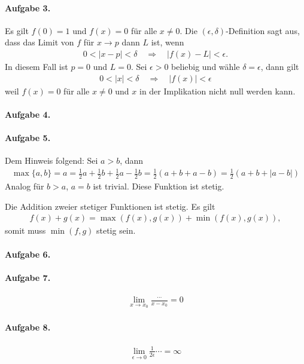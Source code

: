 \documentclass{article}
\begin{document}
\paragraph{Aufgabe 3.} Es gilt $f(0) = 1$ und $f(x) = 0$ für alle $x \neq 0$. Die $(\epsilon, \delta)$-Definition sagt aus, dass das Limit von $f$ für $x \to p$ dann $L$ ist, wenn
\begin{align*}
    0 < |x - p| < \delta \quad \Longrightarrow \quad |f(x) - L| < \epsilon.
\end{align*}
In diesem Fall ist $p = 0$ und $L = 0$. Sei $\epsilon > 0$ beliebig und wähle $\delta = \epsilon$, dann gilt
\begin{align*}
    0 < |x| < \delta \quad \Longrightarrow \quad |f(x)| < \epsilon
\end{align*}
weil $f(x) = 0$ für alle $x \neq 0$ und $x$ in der Implikation nicht null werden kann.

\paragraph{Aufgabe 4.}

\paragraph{Aufgabe 5.} Dem Hinweis folgend: Sei $a > b$, dann
\begin{align*}
    \max\{a, b\} = a = \frac{1}{2}a + \frac{1}{2}b + \frac{1}{2}a - \frac{1}{2}b = \frac{1}{2}(a + b + a - b) = \frac{1}{2}(a + b + |a - b|)
\end{align*}
Analog für $b > a$, $a = b$ ist trivial. Diese Funktion ist stetig.

Die Addition zweier stetiger Funktionen ist stetig. Es gilt \begin{align*}
    f(x) + g(x) = \max(f(x), g(x)) + \min(f(x), g(x)),
\end{align*} somit muss $\min(f, g)$ stetig sein.

\paragraph{Aufgabe 6.}

\paragraph{Aufgabe 7.}


\begin{align*}
    \lim_{x \to x_0} \frac{\cdots}{x - x_0} = 0
\end{align*}

\paragraph{Aufgabe 8.}

\begin{align*}
    \lim_{\epsilon \to 0} \frac{1}{2\epsilon} \cdots = \infty
\end{align*}
\end{document}

